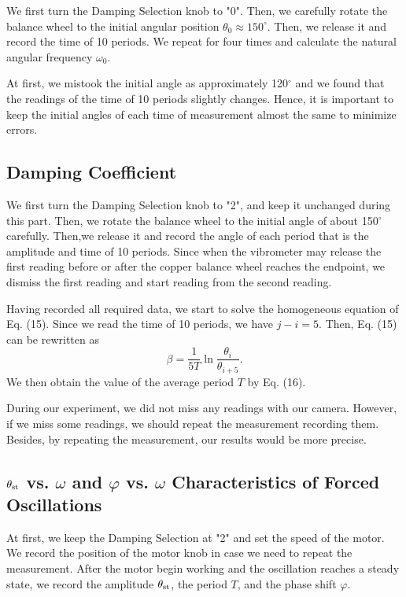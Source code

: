 \documentclass[a4paper]{report}
\begin{document}
	We first turn the \textsf{Damping Selection} knob to "0". Then, we carefully rotate the balance wheel to the initial angular position $\theta_0\approx150^\circ$. Then, we release it and record the time of 10 periods. We repeat for four times and calculate the natural angular frequency $\omega_0$.
	
	At first, we mistook the initial angle as approximately 120$^\circ$ and we found that the readings of the time of 10 periods slightly changes. Hence, it is important to keep the initial angles of each time of measurement almost the same to minimize errors.
	\subsection{Damping Coefficient}
	We first turn the \textsf{Damping Selection} knob to "2", and keep it unchanged during this part. Then, we rotate the balance wheel to the initial angle of about 150$^\circ$ carefully. Then,we release it and record the angle of each period that is the amplitude and time of 10 periods. Since when the vibrometer may release the first reading before or after the copper balance wheel reaches the endpoint, we dismiss the first reading and start reading from the second reading.
	
	Having recorded all required data, we start to solve the homogeneous equation of Eq. (15). Since we read the time of 10 periods, we have $j-i=5$. Then, Eq. (15) can be rewritten as
	\begin{equation}
	\beta=\frac{1}{5T}\ln{\frac{\theta_i}{\theta_{i+5}}}.
	\end{equation}
	We then obtain the value of the average period $T$ by Eq. (16).
	
	During our experiment, we did not miss any readings with our camera. However, if we miss some readings, we should repeat the measurement recording them. Besides, by repeating the measurement, our results would be more precise.
	\subsection{$\theta_{\rm{st}}$ vs. $\omega$ and $\varphi$ vs. $\omega$ Characteristics of Forced Oscillations}
	At first, we keep the \textsf{Damping Selection} at "2" and set the speed of the motor. We record the position of the motor knob in case we need to repeat the measurement. After the motor begin working and the oscillation reaches a steady state, we record the amplitude $\theta_{\rm{st}}$, the period $T$, and the phase shift $\varphi$.
	
\end{document}
